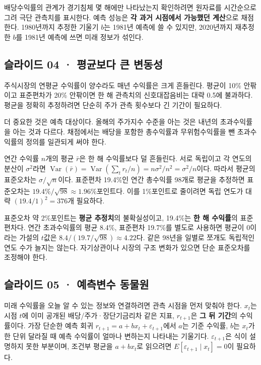 \documentclass[11pt,a4paper]{article}
\begin{document}
배당수익률의 관계가 경기침체 몇 해에만 나타났는지 확인하려면 원자료를 시간순으로 그려 극단 관측치를 표시한다. 예측 성능은 \textbf{각 과거 시점에서 가능했던 계산}으로 채점한다. 1980년까지 추정한 기울기 $b$는 1981년 예측에 쓸 수 있지만, 2020년까지 재추정한 $b$를 1981년 예측에 쓰면 미래 정보가 섞인다.\par

\subsection{슬라이드 04 · 평균보다 큰 변동성}
주식시장의 연평균 수익률이 양수라도 매년 수익률은 크게 흔들린다. 평균이 10\% 안팎이고 표준편차가 20\% 안팎이면 한 해 관측치의 신호대잡음비는 대략 0.5에 불과하다. 평균을 정확히 추정하려면 단순히 주가 관측 횟수보다 긴 기간이 필요하다.\par

더 중요한 것은 예측 대상이다. 올해의 주가지수 수준을 아는 것은 내년의 초과수익률을 아는 것과 다르다. 채점에서는 배당을 포함한 총수익률과 무위험수익률을 뺀 초과수익률의 정의를 일관되게 써야 한다.\par

연간 수익률 $n$개의 평균 $\bar r$은 한 해 수익률보다 덜 흔들린다. 서로 독립이고 각 연도의 분산이 $\sigma^2$라면 $\operatorname{Var}(\bar r)=\operatorname{Var}(\sum_t r_t/n)=n\sigma^2/n^2=\sigma^2/n$이다. 따라서 평균의 표준오차는 $\sigma/\sqrt n$이다. 표준편차 19.4\%인 연간 총수익률 98개로 평균을 추정하면 표준오차는 $19.4\%/\sqrt{98}\approx1.96\%$포인트다. 이를 1\%포인트로 줄이려면 독립 연도가 대략 $(19.4/1)^2=376$개 필요하다.\par

표준오차 약 2\%포인트는 \textbf{평균 추정치}의 불확실성이고, 19.4\%는 \textbf{한 해 수익률}의 표준편차다. 연간 초과수익률의 평균 8.4\%, 표준편차 19.7\%를 별도로 사용하면 평균이 0이라는 가설의 $t$값은 $8.4/(19.7/\sqrt{98})\approx4.22$다. 같은 98년을 일별로 쪼개도 독립적인 연도 수가 늘지는 않는다. 자기상관이나 시장의 구조 변화가 있으면 단순 표준오차를 조정해야 한다.\par

\subsection{슬라이드 05 · 예측변수 동물원}
미래 수익률을 오늘 알 수 있는 정보와 연결하려면 관측 시점을 먼저 맞춰야 한다. $x_t$는 시점 $t$에 이미 공개된 배당/주가·장단기금리차 같은 지표, $r_{t+1}$은 \textbf{그 뒤 기간}의 수익률이다. 가장 단순한 예측 회귀 $r_{t+1}=a+bx_t+\varepsilon_{t+1}$에서 $a$는 기준 수익률, $b$는 $x_t$가 한 단위 달라질 때 예측 수익률이 얼마나 변하는지 나타내는 기울기다. $\varepsilon_{t+1}$은 식이 설명하지 못한 부분이며, 조건부 평균을 $a+bx_t$로 읽으려면 $E[\varepsilon_{t+1}\mid x_t]=0$이 필요하다.\par
\end{document}
